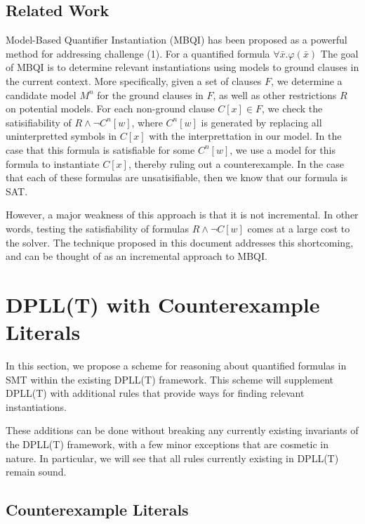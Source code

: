 \documentclass{llncs}
\begin{document}
\subsection{Related Work}

Model-Based Quantifier Instantiation (MBQI) has been proposed as a powerful method for addressing challenge (1).
For a quantified formula $\forall \bar{x}. \varphi(\bar{x})$
The goal of MBQI is to determine relevant instantiations using models to ground clauses in the current context.
More specifically, given a set of clauses $F$, we determine a candidate model $M^n$ for the ground clauses in $F$, as well as other restrictions $R$ on potential models.
For each non-ground clause $C[x] \in F$, we check the satisifiability of $R \wedge \neg C^n[w]$, where $C^n[w]$ is generated by replacing all uninterpretted symbols in $C[x]$ with the interprettation in our model.
In the case that this formula is satisfiable for some $C^n[w]$, we use a model for this formula to instantiate $C[x]$, thereby ruling out a counterexample.
In the case that each of these formulas are unsatisifiable, then we know that our formula is SAT.

However, a major weakness of this approach is that it is not incremental.
In other words, testing the satisfiability of formulas $R \wedge \neg C[w]$ comes at a large cost to the solver.
The technique proposed in this document addresses this shortcoming, and can be thought of as an incremental approach to MBQI.

\section{DPLL(T) with Counterexample Literals}
\label{dpll-ce-lit}

In this section, we propose a scheme for reasoning about quantified formulas in SMT within the existing DPLL(T) framework.
This scheme will supplement DPLL(T) with additional rules that provide ways for finding relevant instantiations.

These additions can be done without breaking any currently existing invariants of the DPLL(T) framework, with a few minor exceptions that are cosmetic in nature.
In particular, we will see that all rules currently existing in DPLL(T) remain sound.

\subsection{Counterexample Literals}
\end{document}
